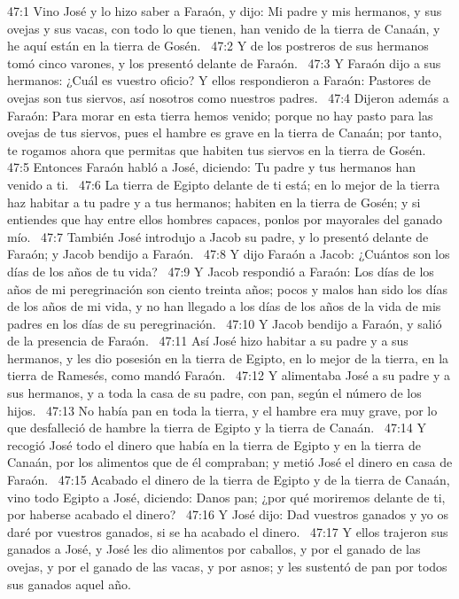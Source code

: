 47:1 Vino José y lo hizo saber a Faraón, y dijo: Mi padre y mis hermanos, y sus ovejas y sus vacas, con todo lo que tienen, han venido de la tierra de Canaán, y he aquí están en la tierra de Gosén.  
47:2 Y de los postreros de sus hermanos tomó cinco varones, y los presentó delante de Faraón.  
47:3 Y Faraón dijo a sus hermanos: ¿Cuál es vuestro oficio? Y ellos respondieron a Faraón: Pastores de ovejas son tus siervos, así nosotros como nuestros padres.  
47:4 Dijeron además a Faraón: Para morar en esta tierra hemos venido; porque no hay pasto para las ovejas de tus siervos, pues el hambre es grave en la tierra de Canaán; por tanto, te rogamos ahora que permitas que habiten tus siervos en la tierra de Gosén.  
47:5 Entonces Faraón habló a José, diciendo: Tu padre y tus hermanos han venido a ti.  
47:6 La tierra de Egipto delante de ti está; en lo mejor de la tierra haz habitar a tu padre y a tus hermanos; habiten en la tierra de Gosén; y si entiendes que hay entre ellos hombres capaces, ponlos por mayorales del ganado mío.  
47:7 También José introdujo a Jacob su padre, y lo presentó delante de Faraón; y Jacob bendijo a Faraón.  
47:8 Y dijo Faraón a Jacob: ¿Cuántos son los días de los años de tu vida?  
47:9 Y Jacob respondió a Faraón: Los días de los años de mi peregrinación son ciento treinta años; pocos y malos han sido los días de los años de mi vida, y no han llegado a los días de los años de la vida de mis padres en los días de su peregrinación.  
47:10 Y Jacob bendijo a Faraón, y salió de la presencia de Faraón.  
47:11 Así José hizo habitar a su padre y a sus hermanos, y les dio posesión en la tierra de Egipto, en lo mejor de la tierra, en la tierra de Ramesés, como mandó Faraón.  
47:12 Y alimentaba José a su padre y a sus hermanos, y a toda la casa de su padre, con pan, según el número de los hijos.  
47:13 No había pan en toda la tierra, y el hambre era muy grave, por lo que desfalleció de hambre la tierra de Egipto y la tierra de Canaán.  
47:14 Y recogió José todo el dinero que había en la tierra de Egipto y en la tierra de Canaán, por los alimentos que de él compraban; y metió José el dinero en casa de Faraón.  
47:15 Acabado el dinero de la tierra de Egipto y de la tierra de Canaán, vino todo Egipto a José, diciendo: Danos pan; ¿por qué moriremos delante de ti, por haberse acabado el dinero?  
47:16 Y José dijo: Dad vuestros ganados y yo os daré por vuestros ganados, si se ha acabado el dinero.  
47:17 Y ellos trajeron sus ganados a José, y José les dio alimentos por caballos, y por el ganado de las ovejas, y por el ganado de las vacas, y por asnos; y les sustentó de pan por todos sus ganados aquel año.  

